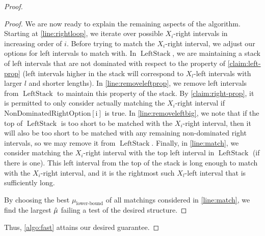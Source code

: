 \begin{proof}
\begin{proof}
        We are now ready to explain the remaining aspects of the algorithm. Starting at \cref{line:rightloop}, we iterate over possible $X_i$-right intervals in increasing order of $i$. Before trying to match the $X_i$-right interval, we adjust our options for left intervals to match with. In $\operatorname{LeftStack}$, we are maintaining a stack of left intervals that are not dominated with respect to the property of \cref{claim:left-prop} (left intervals higher in the stack will correspond to $X_l$-left intervals with larger $l$ and shorter lengths). In \cref{line:removeleftprop}, we remove left intervals from $\operatorname{LeftStack}$ to maintain this property of the stack. By \cref{claim:right-prop}, it is permitted to only consider actually matching the $X_i$-right interval if $\operatorname{NonDominatedRightOption[i]}$ is true. In \cref{line:removeleftbig}, we note that if the top of $\operatorname{LeftStack}$ is too short to be matched with the $X_i$-right interval, then it will also be too short to be matched with any remaining non-dominated right intervals, so we may remove it from $\operatorname{LeftStack}$. Finally, in \cref{line:match}, we consider matching the $X_i$-right interval with the top left interval in $\operatorname{LeftStack}$ (if there is one). This left interval from the top of the stack is long enough to match with the $X_i$-right interval, and it is the rightmost such $X_l$-left interval that is sufficiently long. 

        By choosing the best $\mu_{\textrm{lower-bound}}$ of all matchings considered in \cref{line:match}, we find the largest $\hat{\mu}$ failing a test of the desired structure.
    \end{proof}

    Thus, \cref{algo:fast} attains our desired guarantee.
\end{proof}


